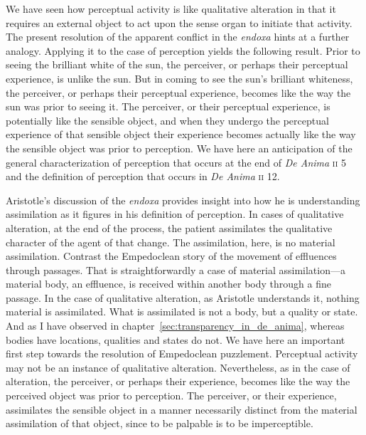 We have seen how perceptual activity is like qualitative alteration in that it requires an external object to act upon the sense organ to initiate that activity. The present resolution of the apparent conflict in the \emph{endoxa} hints at a further analogy. Applying it to the case of perception yields the following result. Prior to seeing the brilliant white of the sun, the perceiver, or perhaps their perceptual experience, is unlike the sun. But in coming to see the sun's brilliant whiteness, the perceiver, or perhaps their perceptual experience, becomes like the way the sun was prior to seeing it. The perceiver, or their perceptual experience, is potentially like the sensible object, and when they undergo the perceptual experience of that sensible object their experience becomes actually like the way the sensible object was prior to perception. We have here an anticipation of the general characterization of perception that occurs at the end of \emph{De Anima} \textsc{ii} 5 and the definition of perception that occurs in \emph{De Anima} \textsc{ii} 12.

Aristotle's discussion of the \emph{endoxa} provides insight into how he is understanding assimilation as it figures in his definition of perception. In cases of qualitative alteration, at the end of the process, the patient assimilates the qualitative character of the agent of that change. The assimilation, here, is no material assimilation. Contrast the Empedoclean story of the movement of effluences through passages. That is straightforwardly a case of material assimilation---a material body, an effluence, is received within another body through a fine passage. In the case of qualitative alteration, as Aristotle understands it, nothing material is assimilated. What is assimilated is not a body, but a quality or state. And as I have observed in chapter~\ref{sec:transparency_in_de_anima}, whereas bodies have locations, qualities and states do not. We have here an important first step towards the resolution of Empedoclean puzzlement. Perceptual activity may not be an instance of qualitative alteration. Nevertheless, as in the case of alteration, the perceiver, or perhaps their experience, becomes like the way the perceived object was prior to perception. The perceiver, or their experience, assimilates the sensible object in a manner necessarily distinct from the material assimilation of that object, since to be palpable is to be imperceptible.

